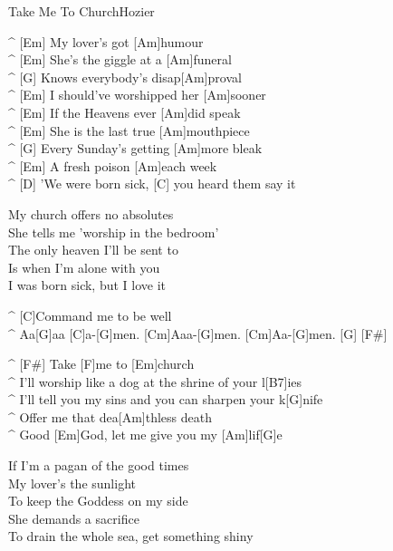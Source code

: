 \begin{song}{Take Me To Church}{Hozier}

\begin{guitar}
^ [Em]  My lover's got [Am]humour\\
^ [Em]  She's the giggle at a [Am]funeral\\
^ [G]  Knows everybody's disap[Am]proval\\
^ [Em]  I should've worshipped her [Am]sooner\\
^ [Em]  If the Heavens ever [Am]did speak\\
^ [Em]  She is the last true [Am]mouthpiece\\
^ [G]  Every Sunday's getting [Am]more bleak\\
^ [Em]  A fresh poison [Am]each week\\
^ [D] 'We were born sick, [C] you heard them say it\\
\end{guitar}

\begin{guitar}
My church offers no absolutes\\
She tells me 'worship in the bedroom'\\
The only heaven I'll be sent to\\
Is when I'm alone with you\\
I was born sick, but I love it\\
\end{guitar}

\begin{guitar}
^ [C]Command me to be well\\
^ Aa[G]aa [C]a-[G]men. [Cm]Aaa-[G]men. [Cm]Aa-[G]men. [G]  [F#]\\
\end{guitar}

\begin{guitar}
^ [F#] Take [F]me to [Em]church\\
^ I'll worship like a dog at the shrine of your l[B7]ies\\
^ I'll tell you my sins and you can sharpen your k[G]nife\\
^ Offer me that dea[Am]thless death\\
^ Good [Em]God, let me give you my [Am]lif[G]e\\
\end{guitar}

\begin{guitar}
If I'm a pagan of the good times\\
My lover's the sunlight\\
To keep the Goddess on my side\\
She demands a sacrifice\\
To drain the whole sea, get something shiny\\
\end{guitar}


\end{song}
